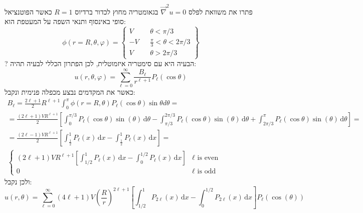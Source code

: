 \documentclass{tstextbook}
\begin{document}
פתרו את משוואת לפלס \(\vec{\nabla} ^2u=0\) בגאומטריה מחוץ לכדור ברדיוס \(R=1\) כאשר הפוטנציאל סופי באינסוף ותנאי השפה על המעטפת הוא:
$$ \phi(r=R,\theta,\varphi)=\begin{Bmatrix}V&&\theta<\pi/3\\-V&&\frac{\pi}{3}<\theta<2\pi/3\\V&&\theta>2\pi/3\end{Bmatrix}$$
?
הבעיה היא עם סימטריה איזמוטלית, לכן הפתרון הכללי לבעיה תהיה:
$$u\left(r,\theta,\varphi\right)=\sum_{\ell=0}^{\infty}\frac{B_{\ell}}{r^{\ell+1}}P_{\ell}\left(\cos\theta\right)$$
כאשר את המקדמים נבצע מכפלה פנימית ונקבל:
\begin{gather*}B_{\ell}=\frac{2\ell+1}{2}R^{\ell+1}\int_{0}^{\pi}\phi\left( r=R,\theta \right)P_{\ell}\left(\cos\theta\right)\sin\theta d\theta= \\=\frac{\left( 2\ell+1 \right)VR^{\ell+1}}{2}\left[ \int_{0}^{\pi/3} P_{\ell}\left( \cos \theta \right)\sin\left( \theta \right) \, \mathrm{d}\theta -\int_{\pi / 3}^{2\pi/3} P_{\ell}\left( \cos \theta \right)\sin\left( \theta \right) \, \mathrm{d}\theta+\int_{2\pi / 3}^{\pi} P_{\ell}\left( \cos \theta \right)\sin\left( \theta \right) \, \mathrm{d}\theta\right] = \\=\frac{\left( 2\ell-1 \right)VR^{\ell+1}}{2}\left[ \int _{\frac{1}{2}}^1 P_{\ell}(x) \, \mathrm{d}x - \int _{\frac{1}{2}}^1 P_{\ell}(x) \, \mathrm{d}x\right]= \\\begin{cases}\left( 2\ell+1 \right)VR^{\ell+1}\left[ \displaystyle\int_{1 / 2}^{1} P_{\ell}(x)\, \mathrm{d}x -\displaystyle\int_{0}^{1 / 2} P_{\ell}(x)\, \mathrm{d}x \right] & \ell \text{ is even } \\0 & \ell \text{ is odd } \end{cases}
\end{gather*}
ולכן נקבל:
$$u\left( r,\theta \right)=\sum_{\ell=0}^\infty \left( 4\ell+1 \right)V\left( \frac{R}{r} \right)^{2\ell+1}\left[ \int _{1 / 2} ^1 P_{2\ell}(x)\, \mathrm{d}x -\int _{0} ^{1 / 2} P_{2\ell}(x)\, \mathrm{d}x  \right]P_{\ell}\left( \cos\left( \theta \right) \right)$$
\end{document}
